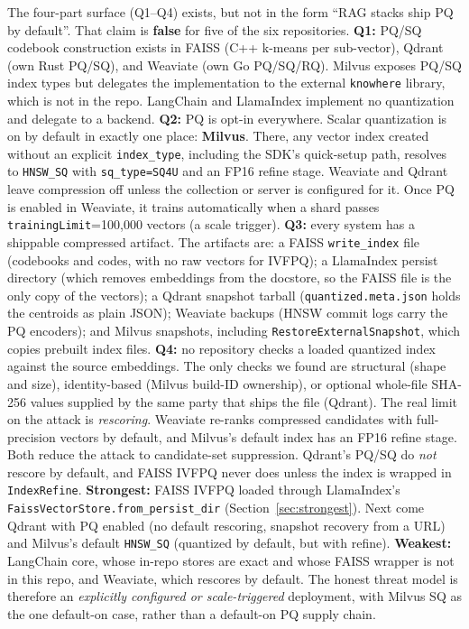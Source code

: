 \documentclass[10pt]{article}
\begin{document}
The four-part surface (Q1--Q4) exists, but not in the form ``RAG stacks ship PQ by
default''. That claim is \textbf{false} for five of the six repositories. \textbf{Q1:} PQ/SQ
codebook construction exists in FAISS (C++ k-means per sub-vector), Qdrant (own Rust PQ/SQ),
and Weaviate (own Go PQ/SQ/RQ). Milvus exposes PQ/SQ index types but delegates the
implementation to the external \texttt{knowhere} library, which is not in the repo. LangChain
and LlamaIndex implement no quantization and delegate to a backend. \textbf{Q2:} PQ is opt-in
everywhere. Scalar quantization is on by default in exactly one place: \textbf{Milvus}. There,
any vector index created without an explicit \texttt{index\_type}, including the SDK's
quick-setup path, resolves to \texttt{HNSW\_SQ} with \texttt{sq\_type=SQ4U} and an FP16
refine stage. Weaviate and Qdrant leave compression off unless the collection or server is
configured for it. Once PQ is enabled in Weaviate, it trains automatically when a shard
passes \texttt{trainingLimit}=100{,}000 vectors (a scale trigger). \textbf{Q3:} every system
has a shippable compressed artifact. The artifacts are: a FAISS \texttt{write\_index} file
(codebooks and codes, with no raw vectors for IVFPQ); a LlamaIndex persist directory (which
removes embeddings from the docstore, so the FAISS file is the only copy of the vectors); a
Qdrant snapshot tarball (\texttt{quantized.meta.json} holds the centroids as plain JSON);
Weaviate backups (HNSW commit logs carry the PQ encoders); and Milvus snapshots, including
\texttt{RestoreExternalSnapshot}, which copies prebuilt index files. \textbf{Q4:} no
repository checks a loaded quantized index against the source embeddings. The only checks we
found are structural (shape and size), identity-based (Milvus build-ID ownership), or
optional whole-file SHA-256 values supplied by the same party that ships the file (Qdrant).
The real limit on the attack is \emph{rescoring}. Weaviate re-ranks compressed candidates
with full-precision vectors by default, and Milvus's default index has an FP16 refine stage.
Both reduce the attack to candidate-set suppression. Qdrant's PQ/SQ do \emph{not} rescore by
default, and FAISS IVFPQ never does unless the index is wrapped in \texttt{IndexRefine}.
\textbf{Strongest:} FAISS IVFPQ loaded through LlamaIndex's
\texttt{FaissVectorStore.from\_persist\_dir} (Section~\ref{sec:strongest}). Next come Qdrant
with PQ enabled (no default rescoring, snapshot recovery from a URL) and Milvus's default
\texttt{HNSW\_SQ} (quantized by default, but with refine). \textbf{Weakest:} LangChain core,
whose in-repo stores are exact and whose FAISS wrapper is not in this repo, and Weaviate,
which rescores by default. The honest threat model is therefore an \emph{explicitly
configured or scale-triggered} deployment, with Milvus SQ as the one default-on case, rather
than a default-on PQ supply chain.
\end{document}
